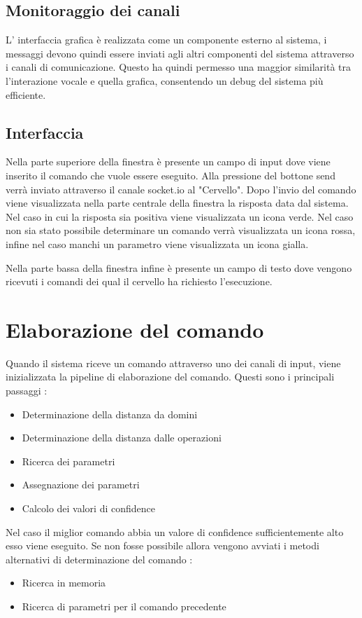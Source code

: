 \documentclass[twoside]{supsistudent}
\begin{document}
\section{Monitoraggio dei canali}
L' interfaccia grafica è realizzata come un componente esterno al sistema, i messaggi devono quindi essere inviati agli altri componenti del sistema attraverso i canali di comunicazione. Questo ha quindi permesso una maggior similarità tra l'interazione vocale e quella grafica, consentendo un debug del sistema più efficiente.
\section{Interfaccia}
Nella parte superiore della finestra è presente un campo di input dove viene inserito il comando che vuole essere eseguito. Alla pressione del bottone send verrà inviato attraverso il canale socket.io al "Cervello".
Dopo l'invio del comando viene visualizzata nella parte centrale della finestra la risposta data dal sistema.
Nel caso in cui la risposta sia positiva viene visualizzata un icona verde. Nel caso non sia stato possibile determinare un comando verrà visualizzata un icona rossa, infine nel caso manchi un parametro viene visualizzata un icona gialla.

Nella parte bassa della finestra infine è presente un campo di testo dove vengono ricevuti i comandi dei qual il cervello ha richiesto l'esecuzione.
\chapter{Elaborazione del comando}
Quando il sistema riceve un comando attraverso uno dei canali di input, viene inizializzata la pipeline di elaborazione del comando.
Questi sono i principali passaggi : 
\begin{itemize}
	\item Determinazione della distanza da domini
	\item Determinazione della distanza dalle operazioni
	\item Ricerca dei parametri
	\item Assegnazione dei parametri
	\item Calcolo dei valori di confidence
\end{itemize}
Nel caso il miglior comando abbia un valore di confidence sufficientemente alto esso viene eseguito. Se non fosse possibile allora vengono avviati i metodi alternativi di determinazione del comando :
\begin{itemize}
	\item Ricerca in memoria
	\item Ricerca di parametri per il comando precedente
\end{itemize}
\end{document}
